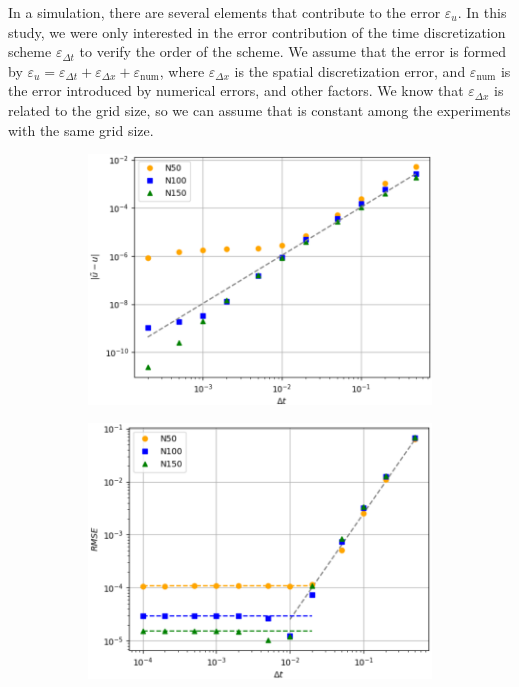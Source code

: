 \documentclass[
  english,        %
  font=times,     %
  onecolumn,      %
]{tumarticle}
\begin{document}
In a simulation, there are several elements that contribute to the error $\varepsilon_{u}$. In this study, we were only interested in the error contribution of the time discretization scheme $\varepsilon_{\Delta t}$ to verify the order of the scheme. We assume that the error is formed by $\varepsilon_u = \varepsilon_{\Delta t} + \varepsilon_{\Delta x} + \varepsilon_\text{num}$, where $\varepsilon_{\Delta x}$ is the spatial discretization error, and $\varepsilon_\text{num}$ is the error introduced by numerical errors, and other factors. We know that $\varepsilon_{\Delta x}$ is related to the grid size, so we can assume that is constant among the experiments with the same grid size.

\begin{figure}[!htbp]
    \centering
    \begin{subfigure}[b]{0.49\textwidth}
      \includegraphics[width=\textwidth]{resources/convergence_study_openfoam.png}
      \caption{}
      \label{fig:convergence_openfoam}
    \end{subfigure}
    \hspace{1pt}
    \begin{subfigure}[b]{0.49\textwidth}
        \includegraphics[width=\textwidth]{resources/RMSE_study.png}

\end{subfigure}
\end{figure}
\end{document}
